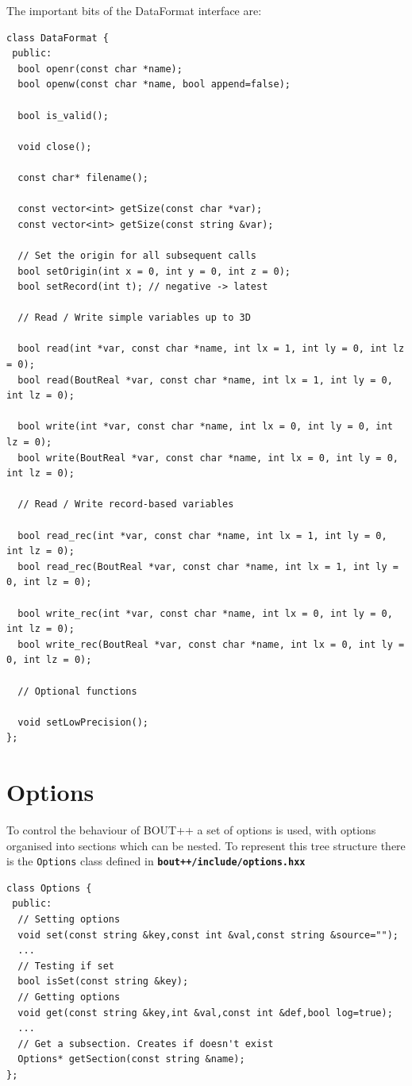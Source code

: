 \documentclass[12pt]{article}
\newcommand{\file}[1]{\texttt{\bf #1}}
\begin{document}
The important bits of the DataFormat interface are: 
\begin{lstlisting}
class DataFormat {
 public:
  bool openr(const char *name);
  bool openw(const char *name, bool append=false);
  
  bool is_valid();
  
  void close();
  
  const char* filename();

  const vector<int> getSize(const char *var);
  const vector<int> getSize(const string &var);

  // Set the origin for all subsequent calls
  bool setOrigin(int x = 0, int y = 0, int z = 0); 
  bool setRecord(int t); // negative -> latest
  
  // Read / Write simple variables up to 3D

  bool read(int *var, const char *name, int lx = 1, int ly = 0, int lz = 0);
  bool read(BoutReal *var, const char *name, int lx = 1, int ly = 0, int lz = 0);

  bool write(int *var, const char *name, int lx = 0, int ly = 0, int lz = 0);
  bool write(BoutReal *var, const char *name, int lx = 0, int ly = 0, int lz = 0);

  // Read / Write record-based variables

  bool read_rec(int *var, const char *name, int lx = 1, int ly = 0, int lz = 0);
  bool read_rec(BoutReal *var, const char *name, int lx = 1, int ly = 0, int lz = 0);

  bool write_rec(int *var, const char *name, int lx = 0, int ly = 0, int lz = 0);
  bool write_rec(BoutReal *var, const char *name, int lx = 0, int ly = 0, int lz = 0);

  // Optional functions
  
  void setLowPrecision();
};
\end{lstlisting}

\section{Options}
To control the behaviour of BOUT++ a set of options is used, with
options organised into sections which can be nested. To represent this
tree structure there is the \lstinline!Options! class defined in
\file{bout++/include/options.hxx} 
\begin{lstlisting}
class Options {
 public:
  // Setting options
  void set(const string &key,const int &val,const string &source="");
  ...
  // Testing if set
  bool isSet(const string &key);
  // Getting options
  void get(const string &key,int &val,const int &def,bool log=true);
  ...
  // Get a subsection. Creates if doesn't exist
  Options* getSection(const string &name);
};
\end{lstlisting}
\end{document}
